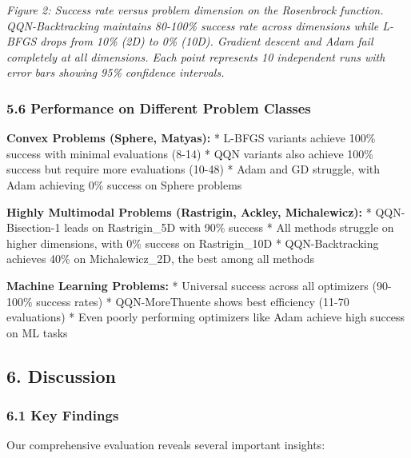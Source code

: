 \emph{Figure 2: Success rate versus problem dimension on the Rosenbrock function. QQN-Backtracking maintains 80-100\% success rate across dimensions while L-BFGS drops from 10\% (2D) to 0\% (10D). Gradient descent and Adam fail completely at all dimensions. Each point represents 10 independent runs with error bars showing 95\% confidence intervals.}

\hypertarget{performance-on-different-problem-classes}{%
\subsubsection{5.6 Performance on Different Problem Classes}\label{performance-on-different-problem-classes}}

\textbf{Convex Problems (Sphere, Matyas):}
* L-BFGS variants achieve 100\% success with minimal evaluations (8-14)
* QQN variants also achieve 100\% success but require more evaluations (10-48)
* Adam and GD struggle, with Adam achieving 0\% success on Sphere problems

\textbf{Highly Multimodal Problems (Rastrigin, Ackley, Michalewicz):}
* QQN-Bisection-1 leads on Rastrigin\_5D with 90\% success
* All methods struggle on higher dimensions, with 0\% success on Rastrigin\_10D
* QQN-Backtracking achieves 40\% on Michalewicz\_2D, the best among all methods

\textbf{Machine Learning Problems:}
* Universal success across all optimizers (90-100\% success rates)
* QQN-MoreThuente shows best efficiency (11-70 evaluations)
* Even poorly performing optimizers like Adam achieve high success on ML tasks

\hypertarget{discussion}{%
\subsection{6. Discussion}\label{discussion}}

\hypertarget{key-findings}{%
\subsubsection{6.1 Key Findings}\label{key-findings}}

Our comprehensive evaluation reveals several important insights:

